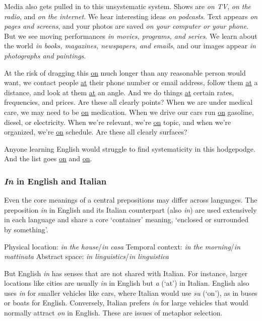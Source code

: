 Media also gets pulled in to this unsystematic system. Shows are \textit{on TV}, \textit{on the radio}, and \textit{on the internet}. We hear interesting ideas \textit{on podcasts}. Text appears \textit{on pages and screens}, and your photos are saved \textit{on your computer or your phone}. But we see moving performances \textit{in movies, programs, and series}. We learn about the world \textit{in books, magazines, newspapers, and emails}, and our images appear \textit{in photographs and paintings}.

At the risk of dragging this \uline{on} much longer than any reasonable person would want, we contact people \uline{at} their phone number or email address, follow them \uline{at} a distance, and look at them \uline{at} an angle. And we do things \uline{at} certain rates, frequencies, and prices. Are these all clearly points? When we are under medical care, we may need to be \uline{on} medication. When we drive our cars run \uline{on} gasoline, diesel, or electricity. When we're relevant, we're \uline{on} topic, and when we're organized, we're \uline{on} schedule. Are these all clearly surfaces? 

Anyone learning English would struggle to find systematicity in this hodgepodge. And the list goes \uline{on} and \uline{on}.

\subsubsection*{\textit{In} in English and Italian}

Even the core meanings of a central prepositions may differ across languages. The preposition \textit{in} in English and its Italian counterpart (also \textit{in}) are used extensively in each language and share a core `container' meaning, `enclosed or surrounded by something'.

\ea \label{ex:in-containment}
    \ea Physical location: \textit{in the house}/\textit{in casa}
    \ex Temporal context: \textit{in the morning}/\textit{in mattinata}
    \ex Abstract space: \textit{in linguistics}/\textit{in linguistica}
    \z
\z

But English \textit{in} has senses that are not shared with Italian. For instance, larger locations like cities are usually \textit{in} in English but \textit{a} (`at') in Italian. English also uses \textit{in} for smaller vehicles like cars, where Italian would use \textit{su} (`on'), as in buses or boats for English. Conversely, Italian prefers \textit{in} for large vehicles that would normally attract \textit{on} in English. These are issues of metaphor selection.

